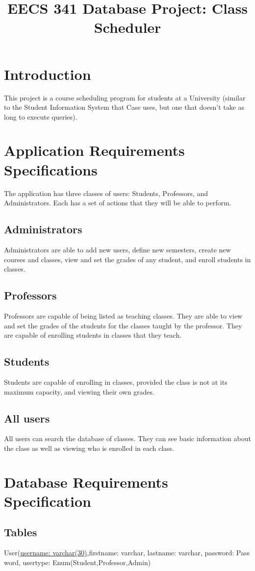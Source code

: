 \documentclass[11pt,oneside,a4paper]{article}
\title{EECS 341 Database Project: Class Scheduler}
\begin{document}
\maketitle
\section{Introduction}
This project is a course scheduling program for students at a University
(similar to the Student Information System that Case uses, but one that doesn't
take as long to execute queries).
\section{Application Requirements Specifications}
The application has three classes of users: Students, Professors, and
Administrators. Each has a set of actions that they will be able to perform.
\subsection{Administrators}
Administrators are able to add new users, define new semesters, create new
courses and classes, view and set the grades of any student, and enroll students in
classes.
\subsection{Professors}
Professors are capable of being listed as teaching classes. They are able to
view and set the grades of the students for the classes taught by the
professor. They are capable of enrolling students in classes that they teach.
\subsection{Students}
Students are capable of enrolling in classes, provided the class is not at its
maximum capacity, and viewing their own grades.
\subsection{All users}
All users can search the database of classes. They can see basic information
about the class as well as viewing who is enrolled in each class.

\section{Database Requirements Specification}
\subsection{Tables}
User(\underline{username: varchar(30)},firstname: varchar, lastname: varchar,
password: Pass	word, usertype: Enum(Student,Professor,Admin)
\end{document}
